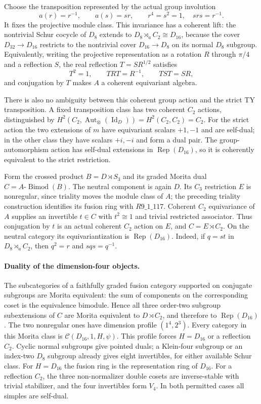 Choose the transposition represented by the actual group involution
\[
 a(r)=r^{-1},\qquad a(s)=sr,
 \qquad r^4=s^2=1,\quad srs=r^{-1}.
\]
It fixes the projective module class.  This invariance has a coherent lift:
the nontrivial Schur cocycle of $D_8$ extends to
$D_8\rtimes_a C_2\cong D_{16}$, because the cover $D_{32}\to D_{16}$
restricts to the nontrivial cover $D_{16}\to D_8$ on its normal $D_8$
subgroup.  Equivalently, writing the projective representation as a
rotation $R$ through $\pi/4$ and a reflection $S$, the real reflection
$T=SR^{1/2}$ satisfies
\[
 T^2=1,\qquad TRT=R^{-1},\qquad TST=SR,
\]
and conjugation by $T$ makes $A$ a coherent equivariant algebra.

There is also no ambiguity between this coherent group action and the
strict TY transposition.  A fixed transposition class has two coherent
$C_2$ actions, distinguished by
$H^2(C_2,\operatorname{Aut}_\otimes(\operatorname{Id}_D))
=H^2(C_2,C_2)=C_2$.
For the strict action the two extensions of $m$ have equivariant scalars
$+1,-1$ and are self-dual; in the other class they have scalars $+i,-i$
and form a dual pair.  The group-automorphism action has self-dual
extensions in $\operatorname{Rep}(D_{16})$, so it is coherently equivalent
to the strict restriction.

Form the crossed product $B=D\rtimes S_3$ and its graded Morita dual
$C=A\text{-}\operatorname{Bimod}(B)$.  The neutral component is again $D$.
Its $C_3$ restriction $E$ is nonregular, since triality moves the module
class of $A$; the preceding triality construction identifies its fusion
ring with $R9\_1\_117$.  Coherent $C_2$ equivariance of $A$ supplies an
invertible $t\in C$ with $t^2\cong1$ and trivial restricted associator.
Thus conjugation by $t$ is an actual coherent $C_2$ action on $E$, and
$C=E\rtimes C_2$.  On the neutral category its equivariantization is
$\operatorname{Rep}(D_{16})$.  Indeed, if $q=st$ in
$D_8\rtimes_a C_2$, then $q^2=r$ and $sqs=q^{-1}$.

\paragraph{Duality of the dimension-four objects.}
The subcategories of a faithfully graded fusion category supported on
conjugate subgroups are Morita equivalent: the sum of components on the
corresponding coset is the equivalence bimodule.  Hence all three
order-two subgroup subextensions of $C$ are Morita equivalent to
$D\rtimes C_2$, and therefore to $\operatorname{Rep}(D_{16})$.
The two nonregular ones have dimension profile $(1^4,2^3)$.
Every category in this Morita class is
$\mathcal C(D_{16},1,H,\psi)$.  This profile forces $H=D_{16}$ or a
reflection $C_2$.  Cyclic normal subgroups give pointed duals; a
Klein-four subgroup or an index-two $D_8$ subgroup already gives eight
invertibles, for either available Schur class.  For $H=D_{16}$ the fusion
ring is the representation ring of $D_{16}$.  For a reflection $C_2$,
the three non-normalizer double cosets are inverse-stable with trivial
stabilizer, and the four invertibles form $V_4$.  In both permitted
cases all simples are self-dual.

